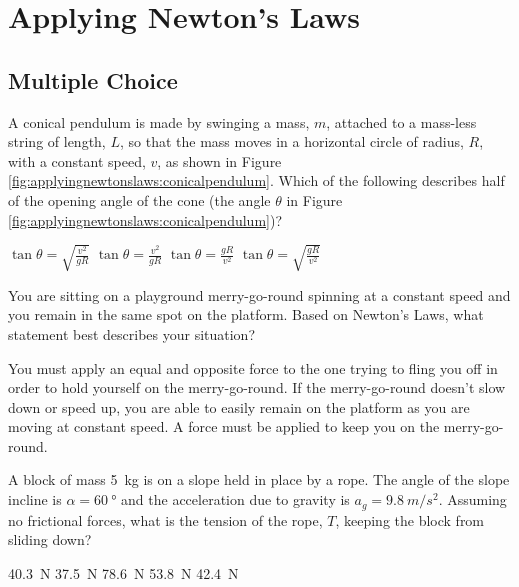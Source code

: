 \section{Applying Newton's Laws}


\subsection{Multiple Choice}

\question \label{question:applyingnewtonslaws:conicalpendulum} A conical pendulum is made by swinging a mass, $m$, attached to a mass-less string of length, $L$, so that the mass moves in a horizontal circle of radius, $R$, with a constant speed, $v$, as shown in Figure \ref{fig:applyingnewtonslaws:conicalpendulum}. Which of the following describes half of the opening angle of the cone (the angle $\theta$ in Figure \ref{fig:applyingnewtonslaws:conicalpendulum})?
\begin{checkboxes} 
	\choice $\tan\theta=\sqrt{\frac{v^2}{gR}}$
	\CorrectChoice $\tan\theta=\frac{v^2}{gR}$
	\choice $\tan\theta=\frac{gR}{v^2}$
	\choice $\tan\theta=\sqrt{\frac{gR}{v^2}}$
\end{checkboxes}

\question You are sitting on a playground merry-go-round spinning at a constant speed and you remain in the same spot on the platform. Based on Newton's Laws, what statement best describes your situation?
\begin{checkboxes}
\choice You must apply an equal and opposite force to the one trying to fling you off in order to hold yourself on the merry-go-round.
\choice If the merry-go-round doesn't slow down or speed up, you are able to easily remain on the platform as you are moving at constant speed.
\CorrectChoice A force must be applied to keep you on the merry-go-round. \correct
\end{checkboxes}


\question A block of mass \SI{5}{kg} is on a slope held in place by a rope. The angle of the slope incline is $\alpha = \SI{60}{\degree}$ and the acceleration due to gravity is $a_g = \SI{9.8}{m/s^2}$. Assuming no frictional forces, what is the tension of the rope, $T$, keeping the block from sliding down?
\begin{checkboxes}
\choice \SI{40.3}{N}
\choice \SI{37.5}{N}
\choice \SI{78.6}{N}
\choice \SI{53.8}{N}
\CorrectChoice \SI{42.4}{N} \correct
\end{checkboxes}



